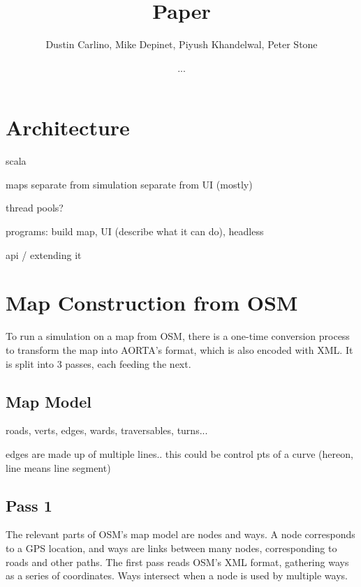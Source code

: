 \documentclass[12pt]{article}
\title{Paper}
\author{Dustin Carlino, Mike Depinet, Piyush Khandelwal, Peter Stone}
\date{...}
\begin{document}
\maketitle



\section{Architecture}

scala

maps separate from simulation separate from UI (mostly)

thread pools?

programs: build map, UI (describe what it can do), headless

api / extending it

\section{Map Construction from OSM}


To run a simulation on a map from OSM, there is a one-time conversion process to
transform the map into AORTA's format, which is also encoded with XML. It is
split into 3 passes, each feeding the next.

\subsection{Map Model}

roads, verts, edges, wards, traversables, turns...

edges are made up of multiple lines.. this could be control pts of a curve
(hereon, line means line segment)

\subsection{Pass 1}

The relevant parts of OSM's map model are nodes and ways. A node corresponds to
a GPS location, and ways are links between many nodes, corresponding to roads
and other paths. The first pass reads OSM's XML format, gathering ways as a
series of coordinates. Ways intersect when a node is used by multiple ways.
\end{document}

